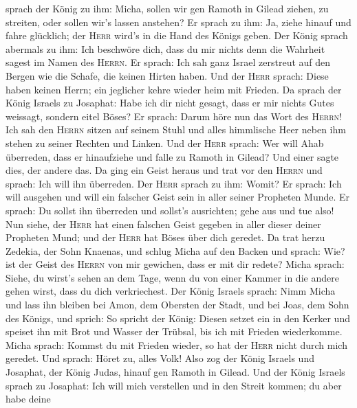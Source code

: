 sprach der König zu ihm: Micha, sollen wir gen Ramoth in Gilead ziehen,
zu streiten, oder sollen wir's lassen anstehen? Er sprach zu ihm: Ja,
ziehe hinauf und fahre glücklich; der \textsc{Herr} wird's in die Hand
des Königs geben.  Der König sprach abermals zu ihm: Ich
beschwöre dich, dass du mir nichts denn die Wahrheit sagest im Namen des
\textsc{Herrn}.  Er sprach: Ich sah ganz Israel zerstreut
auf den Bergen wie die Schafe, die keinen Hirten haben. Und der
\textsc{Herr} sprach: Diese haben keinen Herrn; ein jeglicher kehre
wieder heim mit Frieden.  Da sprach der König Israels zu
Josaphat: Habe ich dir nicht gesagt, dass er mir nichts Gutes weissagt,
sondern eitel Böses?  Er sprach: Darum höre nun das Wort
des \textsc{Herrn}! Ich sah den \textsc{Herrn} sitzen auf seinem Stuhl
und alles himmlische Heer neben ihm stehen zu seiner Rechten und Linken.
 Und der \textsc{Herr} sprach: Wer will Ahab überreden,
dass er hinaufziehe und falle zu Ramoth in Gilead? Und einer sagte dies,
der andere das.  Da ging ein Geist heraus und trat vor
den \textsc{Herrn} und sprach: Ich will ihn überreden. Der \textsc{Herr}
sprach zu ihm: Womit?  Er sprach: Ich will ausgehen und
will ein falscher Geist sein in aller seiner Propheten Munde. Er sprach:
Du sollst ihn überreden und sollst's ausrichten; gehe aus und tue also!
 Nun siehe, der \textsc{Herr} hat einen falschen Geist
gegeben in aller dieser deiner Propheten Mund; und der \textsc{Herr} hat
Böses über dich geredet.  Da trat herzu Zedekia, der Sohn
Knaenas, und schlug Micha auf den Backen und sprach: Wie? ist der Geist
des \textsc{Herrn} von mir gewichen, dass er mit dir redete?
 Micha sprach: Siehe, du wirst's sehen an dem Tage, wenn
du von einer Kammer in die andere gehen wirst, dass du dich
verkriechest.  Der König Israels sprach: Nimm Micha und
lass ihn bleiben bei Amon, dem Obersten der Stadt, und bei Joas, dem
Sohn des Königs,  und sprich: So spricht der König:
Diesen setzet ein in den Kerker und speiset ihn mit Brot und Wasser der
Trübsal, bis ich mit Frieden wiederkomme.  Micha sprach:
Kommst du mit Frieden wieder, so hat der \textsc{Herr} nicht durch mich
geredet. Und sprach: Höret zu, alles Volk!  Also zog der
König Israels und Josaphat, der König Judas, hinauf gen Ramoth in
Gilead.  Und der König Israels sprach zu Josaphat: Ich
will mich verstellen und in den Streit kommen; du aber habe deine
